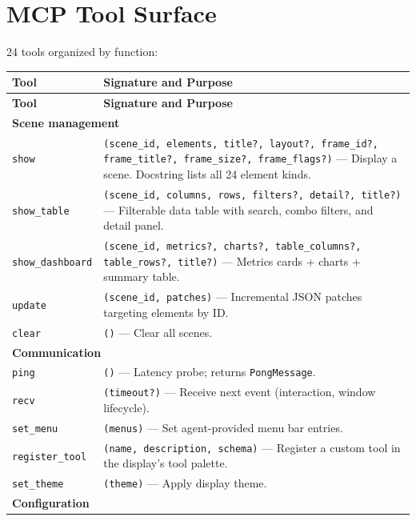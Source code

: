 \documentclass[a4paper,10pt]{article}
\newcommand{\tool}[1]{\texttt{#1}}
\newcommand{\msg}[1]{\texttt{#1}}
\begin{document}
\section{MCP Tool Surface}

24 tools organized by function:

\begin{center}
\begin{longtable}{lp{8cm}}
\toprule
\textbf{Tool} & \textbf{Signature and Purpose} \\
\midrule
\endfirsthead
\toprule
\textbf{Tool} & \textbf{Signature and Purpose} \\
\midrule
\endhead
\multicolumn{2}{l}{\textbf{Scene management}} \\
\midrule
\tool{show}           & \texttt{(scene\_id, elements, title?, layout?,
  frame\_id?, frame\_title?, frame\_size?, frame\_flags?)}
  --- Display a scene.  Docstring lists all 24 element kinds. \\
\tool{show\_table}    & \texttt{(scene\_id, columns, rows, filters?,
  detail?, title?)} --- Filterable data table with search, combo
  filters, and detail panel. \\
\tool{show\_dashboard} & \texttt{(scene\_id, metrics?, charts?,
  table\_columns?, table\_rows?, title?)} --- Metrics cards + charts +
  summary table. \\
\tool{update}         & \texttt{(scene\_id, patches)} --- Incremental
  JSON patches targeting elements by ID. \\
\tool{clear}          & \texttt{()} --- Clear all scenes. \\
\midrule
\multicolumn{2}{l}{\textbf{Communication}} \\
\midrule
\tool{ping}           & \texttt{()} --- Latency probe; returns
  \msg{PongMessage}. \\
\tool{recv}           & \texttt{(timeout?)} --- Receive next event
  (interaction, window lifecycle). \\
\tool{set\_menu}      & \texttt{(menus)} --- Set agent-provided menu
  bar entries. \\
\tool{register\_tool} & \texttt{(name, description, schema)} --- Register
  a custom tool in the display's tool palette. \\
\tool{set\_theme}     & \texttt{(theme)} --- Apply display theme. \\
\midrule
\multicolumn{2}{l}{\textbf{Configuration}} \\

\end{longtable}
\end{center}
\end{document}
